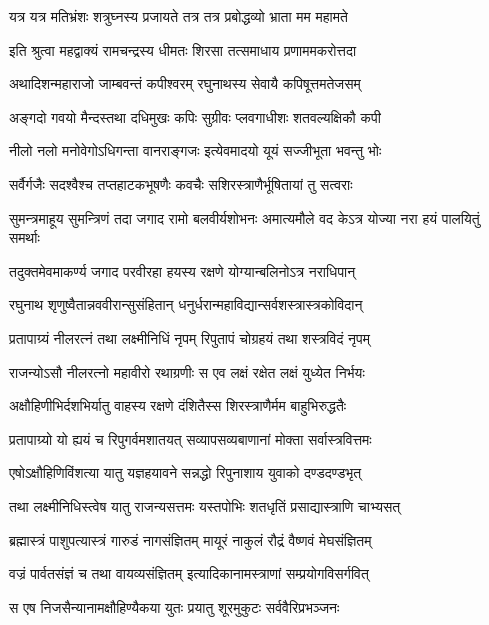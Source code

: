 \twolineshloka
{यत्र यत्र मतिभ्रंशः शत्रुघ्नस्य प्रजायते}
{तत्र तत्र प्रबोद्धव्यो भ्राता मम महामते}%

\twolineshloka
{इति श्रुत्वा महद्वाक्यं रामचन्द्रस्य धीमतः}
{शिरसा तत्समाधाय प्रणाममकरोत्तदा}%

\twolineshloka
{अथादिशन्महाराजो जाम्बवन्तं कपीश्वरम्}
{रघुनाथस्य सेवायै कपिषूत्तमतेजसम्}%

\twolineshloka
{अङ्गदो गवयो मैन्दस्तथा दधिमुखः कपिः}
{सुग्रीवः प्लवगाधीशः शतवल्यक्षिकौ कपी}%

\twolineshloka
{नीलो नलो मनोवेगोऽधिगन्ता वानराङ्गजः}
{इत्येवमादयो यूयं सज्जीभूता भवन्तु भोः}%

\twolineshloka
{सर्वैर्गजैः सदश्वैश्च तप्तहाटकभूषणैः}
{कवचैः सशिरस्त्राणैर्भूषितायां तु सत्वराः}%


\twolineshloka
{सुमन्त्रमाहूय सुमन्त्रिणं तदा जगाद रामो बलवीर्यशोभनः}
{अमात्यमौले वद केऽत्र योज्या नरा हयं पालयितुं समर्थाः}%

\twolineshloka
{तदुक्तमेवमाकर्ण्य जगाद परवीरहा}
{हयस्य रक्षणे योग्यान्बलिनोऽत्र नराधिपान्}%

\twolineshloka
{रघुनाथ शृणुष्वैतान्नववीरान्सुसंहितान्}
{धनुर्धरान्महाविद्यान्सर्वशस्त्रास्त्रकोविदान्}%

\twolineshloka
{प्रतापाग्र्यं नीलरत्नं तथा लक्ष्मीनिधिं नृपम्}
{रिपुतापं चोग्रहयं तथा शस्त्रविदं नृपम्}%

\twolineshloka
{राजन्योऽसौ नीलरत्नो महावीरो रथाग्रणीः}
{स एव लक्षं रक्षेत लक्षं युध्येत निर्भयः}%

\twolineshloka
{अक्षौहिणीभिर्दशभिर्यातु वाहस्य रक्षणे}
{दंशितैस्स शिरस्त्राणैर्मम बाहुभिरुद्धतैः}%

\twolineshloka
{प्रतापाग्र्यो यो ह्ययं च रिपुगर्वमशातयत्}
{सव्यापसव्यबाणानां मोक्ता सर्वास्त्रवित्तमः}%

\twolineshloka
{एषोऽक्षौहिणिविंशत्या यातु यज्ञहयावने}
{सन्नद्धो रिपुनाशाय युवाको दण्डदण्डभृत्}%

\twolineshloka
{तथा लक्ष्मीनिधिस्त्वेष यातु राजन्यसत्तमः}
{यस्तपोभिः शतधृतिं प्रसाद्यास्त्राणि चाभ्यसत्}%

\twolineshloka
{ब्रह्मास्त्रं पाशुपत्यास्त्रं गारुडं नागसंज्ञितम्}
{मायूरं नाकुलं रौद्रं वैष्णवं मेघसंज्ञितम्}%

\twolineshloka
{वज्रं पार्वतसंज्ञं च तथा वायव्यसंज्ञितम्}
{इत्यादिकानामस्त्राणां सम्प्रयोगविसर्गवित्}%

\twolineshloka
{स एष निजसैन्यानामक्षौहिण्यैकया युतः}
{प्रयातु शूरमुकुटः सर्ववैरिप्रभञ्जनः}%

